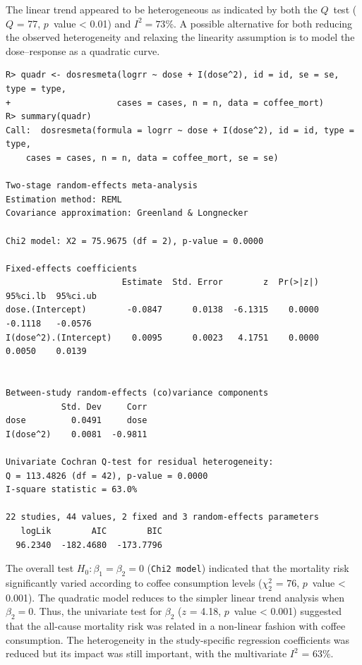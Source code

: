 \documentclass[11pt,a4paper,twoside,openany]{book}\usepackage{knitr}
\begin{document}
{{\noindent The linear trend appeared to be heterogeneous as indicated by both the $Q$~test ($Q$ = 77, $p$~value < 0.01) and $I^2 = 73$\%.
A possible alternative for both reducing the observed heterogeneity and relaxing the linearity assumption is to model the dose--response as a quadratic curve.
\begin{knitrout}\footnotesize
{}\color{fgcolor}\begin{kframe}
\begin{verbatim}
R> quadr <- dosresmeta(logrr ~ dose + I(dose^2), id = id, se = se, type = type,
+                     cases = cases, n = n, data = coffee_mort)
R> summary(quadr)
Call:  dosresmeta(formula = logrr ~ dose + I(dose^2), id = id, type = type, 
    cases = cases, n = n, data = coffee_mort, se = se)

Two-stage random-effects meta-analysis
Estimation method: REML
Covariance approximation: Greenland & Longnecker

Chi2 model: X2 = 75.9675 (df = 2), p-value = 0.0000

Fixed-effects coefficients
                       Estimate  Std. Error        z  Pr(>|z|)  95%ci.lb  95%ci.ub
dose.(Intercept)        -0.0847      0.0138  -6.1315    0.0000   -0.1118   -0.0576
I(dose^2).(Intercept)    0.0095      0.0023   4.1751    0.0000    0.0050    0.0139


Between-study random-effects (co)variance components
           Std. Dev     Corr
dose         0.0491     dose
I(dose^2)    0.0081  -0.9811

Univariate Cochran Q-test for residual heterogeneity:
Q = 113.4826 (df = 42), p-value = 0.0000
I-square statistic = 63.0%

22 studies, 44 values, 2 fixed and 3 random-effects parameters
   logLik        AIC        BIC  
  96.2340  -182.4680  -173.7796  
\end{verbatim}
\end{kframe}
\end{knitrout}

\noindent The overall test $H_0: \beta_1 = \beta_2 = 0$ (\texttt{Chi2 model}) indicated that the mortality risk significantly varied according to coffee consumption levels ($\chi_2^2$ = 76, $p$~value < 0.001). The quadratic model reduces to the simpler linear trend analysis when $\beta_2 = 0$. Thus, the univariate test for $\beta_2$ ($z$ = 4.18, $p$~value < 0.001) suggested that the all-cause mortality risk was related in a non-linear fashion with coffee consumption. The heterogeneity in the study-specific regression coefficients was reduced but its impact was still important, with the multivariate $I^2$ = 63\%. 

}}
\end{document}
